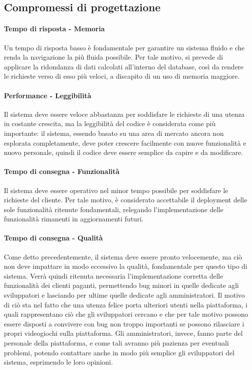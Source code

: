 \subsection{Compromessi di progettazione}
\paragraph{Tempo di risposta - Memoria}
Un tempo di risposta basso è fondamentale per garantire un sistema fluido e che renda la navigazione la più fluida possibile. Per tale motivo, si prevede di applicare la ridondanza di dati calcolati all’interno del database, così da rendere le richieste verso di esso più veloci, a discapito di un uso di memoria maggiore.

\paragraph{Performance - Leggibilità}
Il sistema deve essere veloce abbastanza per soddisfare le richieste di una utenza in costante crescita, ma la leggibilità del codice è considerata come più importante: il sistema, essendo basato su una area di mercato ancora non esplorata completamente, deve poter crescere facilmente con nuove funzionalità e nuovo personale, quindi il codice deve essere semplice da capire e da modificare.

\paragraph{Tempo di consegna - Funzionalità}
Il sistema deve essere operativo nel minor tempo possibile per soddisfare le richieste del cliente. Per tale motivo, è considerato accettabile il deployment delle sole funzionalità ritenute fondamentali, relegando l’implementazione delle funzionalità rimanenti in aggiornamenti futuri.

\paragraph{Tempo di consegna - Qualità}
Come detto precedentemente, il sistema deve essere pronto velocemente, ma ciò non deve impattare in modo eccessivo la qualità, fondamentale per questo tipo di sistema. Verrà quindi ritenuta necessaria l’implementazione corretta delle funzionalità dei clienti paganti, permettendo bug minori in quelle dedicate agli sviluppatori e lasciando per ultime quelle dedicate agli amministratori. Il motivo di ciò sta nel fatto che una utenza felice porta ulteriori utenti nella piattaforma, i quali rappresentano ciò che gli sviluppatori cercano e che per tale motivo possono essere disposti a convivere con bug non troppo importanti se possono rilasciare i propri videogiochi sulla piattaforma. Gli amministratori, invece, fanno parte del personale della piattaforma, e come tali avranno più pazienza per eventuali problemi, potendo contattare anche in modo più semplice gli sviluppatori del sistema, esprimendo le loro opinioni.

